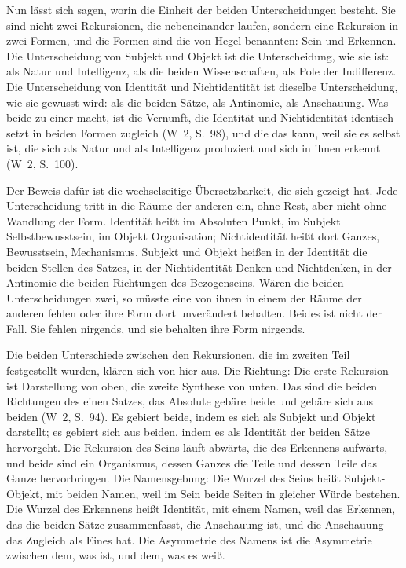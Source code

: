 \documentclass[11pt,a4paper]{article}
\newcommand{\SO}{Subjekt-Objekt}
\newcommand{\Werke}[1]{(W~2, S.~#1)}
\begin{document}
Nun lässt sich sagen, worin die Einheit der beiden Unterscheidungen besteht. Sie sind nicht zwei Rekursionen, die nebeneinander laufen, sondern eine Rekursion in zwei Formen, und die Formen sind die von Hegel benannten: Sein und Erkennen. Die Unterscheidung von Subjekt und Objekt ist die Unterscheidung, wie sie ist: als Natur und Intelligenz, als die beiden Wissenschaften, als Pole der Indifferenz. Die Unterscheidung von Identität und Nichtidentität ist dieselbe Unterscheidung, wie sie gewusst wird: als die beiden Sätze, als Antinomie, als Anschauung. Was beide zu einer macht, ist die Vernunft, die \glqq Identität und Nichtidentität identisch setzt\grqq{} in beiden Formen zugleich \Werke{98}, und die das kann, weil sie es selbst ist, die sich als Natur und als Intelligenz produziert und sich in ihnen erkennt \Werke{100}.

Der Beweis dafür ist die wechselseitige Übersetzbarkeit, die sich gezeigt hat. Jede Unterscheidung tritt in die Räume der anderen ein, ohne Rest, aber nicht ohne Wandlung der Form. Identität heißt im Absoluten Punkt, im Subjekt Selbstbewusstsein, im Objekt Organisation; Nichtidentität heißt dort Ganzes, Bewusstsein, Mechanismus. Subjekt und Objekt heißen in der Identität die beiden Stellen des Satzes, in der Nichtidentität Denken und Nichtdenken, in der Antinomie die beiden Richtungen des Bezogenseins. Wären die beiden Unterscheidungen zwei, so müsste eine von ihnen in einem der Räume der anderen fehlen oder ihre Form dort unverändert behalten. Beides ist nicht der Fall. Sie fehlen nirgends, und sie behalten ihre Form nirgends.

Die beiden Unterschiede zwischen den Rekursionen, die im zweiten Teil festgestellt wurden, klären sich von hier aus. Die Richtung: Die erste Rekursion ist Darstellung von oben, die zweite Synthese von unten. Das sind die beiden Richtungen des einen Satzes, das Absolute gebäre beide und gebäre sich aus beiden \Werke{94}. Es gebiert beide, indem es sich als Subjekt und Objekt darstellt; es gebiert sich aus beiden, indem es als Identität der beiden Sätze hervorgeht. Die Rekursion des Seins läuft abwärts, die des Erkennens aufwärts, und beide sind ein Organismus, dessen Ganzes die Teile und dessen Teile das Ganze hervorbringen. Die Namensgebung: Die Wurzel des Seins heißt \SO{}, mit beiden Namen, weil im Sein beide Seiten in gleicher Würde bestehen. Die Wurzel des Erkennens heißt Identität, mit einem Namen, weil das Erkennen, das die beiden Sätze zusammenfasst, die Anschauung ist, und die Anschauung das Zugleich als Eines hat. Die Asymmetrie des Namens ist die Asymmetrie zwischen dem, was ist, und dem, was es weiß.
\end{document}
